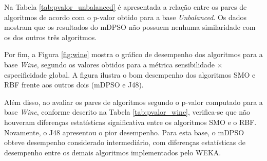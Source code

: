 \documentclass[
	12pt,				%
	openany,			%
	oneside,	
	a4paper,			%
	brazil,				%
	]{unimontes-ppgmsc-abntex2}
\begin{document}
Na Tabela \ref{tab:pvalor_unbalanced} é apresentada a relação entre os pares de algoritmos de acordo com o p-valor obtido para a base {\em Unbalanced}. Os dados mostram que os resultados do mDPSO não possuem nenhuma similaridade com os dos outros três algoritmos. 

\begin{table}[!ht]
\setlength{\arrayrulewidth}{.2em}
\vspace{12pt}
\centering{}
\caption{p-valor medido para o produto da sensibilidade pela especificidade global de cada algoritmo na base de dados {\em Unbalanced}.}
\label{tab:pvalor_unbalanced}
\end{table}

Por fim, a Figura \ref{fig:wine} mostra o gráfico de desempenho dos algoritmos para a base {\em Wine}, segundo os valores obtidos para a métrica sensibilidade $\times$ especificidade global. A figura ilustra o bom desempenho dos algoritmos SMO e RBF frente aos outros dois (mDPSO e J48).  

Além disso, ao avaliar os pares de algoritmos segundo o p-valor computado para a base {\em Wine}, conforme descrito na Tabela \ref{tab:pvalor_wine}, verifica-se que não houveram diferenças estatísticas significativa entre os algoritmos SMO e o RBF. Novamente, o J48 apresentou o pior desempenho. Para esta base, o mDPSO obteve desempenho considerado intermediário, com diferenças estatísticas de desempenho entre os demais algoritmos implementados pelo WEKA.
\end{document}
